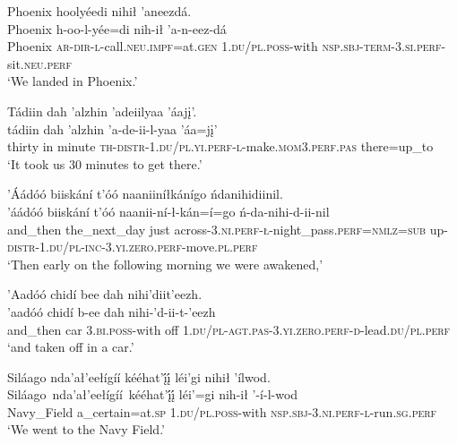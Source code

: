 \ea\label{ex:text9-1-5}
Phoenix hoolyéedi nihił ’aneezdá.\\
\gll Phoenix	h-oo-l-yée=di	nih-ił	’a-n-eez-dá\\
     Phoenix	\textsc{ar}-\textsc{dir}-\textsc{l}-call.\textsc{neu}.\textsc{impf}=at.\textsc{gen}	1.\textsc{du}/\textsc{pl}.\textsc{poss}-with	\textsc{nsp}.\textsc{sbj}-\textsc{term}-3.\textsc{si}.\textsc{perf}-sit.\textsc{neu}.\textsc{perf}\\
\glt `We landed in Phoenix.'
\z

\ea\label{ex:text9-1-6}
Tádiin dah ’alzhin ’adeiilyaa ’áajį’.\\
\gll tádiin	dah	’alzhin	’a-de-ii-l-yaa	’áa=jį’\\
     thirty	in	minute	\textsc{th}-\textsc{distr}-1.\textsc{du}/\textsc{pl}.\textsc{yi}.\textsc{perf}-\textsc{l}-make.\textsc{mom}3.\textsc{perf}.\textsc{pas}	there=up\_to\\
\glt `It took us 30 minutes to get there.'
\z

\ea\label{ex:text9-2-1}
’Áádóó biiskání t’óó naaniiníłkánígo ńdanihidiinil.\\
\gll ’áádóó	biiskání	t’óó	naanii-ní-ł-kán=í=go	ń-da-nihi-d-ii-nil\\
     and\_then	the\_next\_day	just	across-3.\textsc{ni}.\textsc{perf}-\textsc{ł}-night\_pass.\textsc{perf}=\textsc{nmlz}=\textsc{sub}	up-\textsc{distr}-1.\textsc{du}/\textsc{pl}-\textsc{inc}-3.\textsc{yi}.\textsc{zero}.\textsc{perf}-move.\textsc{pl}.\textsc{perf}\\
\glt `Then early on the following morning we were awakened,'
\z

\ea\label{ex:text9-2-2}
’Aadóó chidí bee dah nihi’diit’eezh.\\
\gll ’aadóó	chidí	b-ee	dah	nihi-’d-ii-t-’eezh\\
     and\_then	car	3.\textsc{bi}.\textsc{poss}-with	off	1.\textsc{du}/\textsc{pl}-\textsc{agt}.\textsc{pas}-3.\textsc{yi}.\textsc{zero}.\textsc{perf}-\textsc{d}-lead.\textsc{du}/\textsc{pl}.\textsc{perf}\\
\glt `and taken off in a car.'
\z

\ea\label{ex:text9-2-3}
Siláago nda’ał’eełígíí kééhat’į́į́ léi’gi nihił ’ílwod.\\
\gll Siláago~nda’ał’eełígíí~{kééhat’į́į́}	léi’=gi	nih-ił	’-í-l-wod\\
     Navy\_Field	a\_certain=at.\textsc{sp}	1.\textsc{du}/\textsc{pl}.\textsc{poss}-with	\textsc{nsp}.\textsc{sbj}-3.\textsc{ni}.\textsc{perf}-\textsc{l}-run.\textsc{sg}.\textsc{perf}\\
\glt `We went to the Navy Field.'
\z

